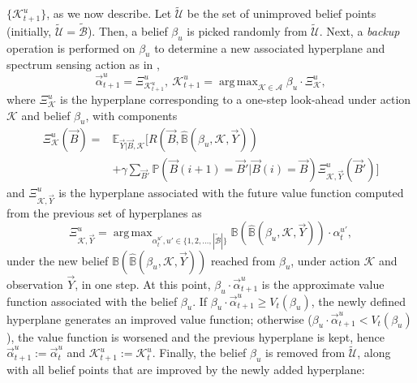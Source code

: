 \documentclass[10pt,twocolumn]{IEEEtran}
\DeclareMathOperator*{\argmax}{arg\,max}
\begin{document}
$\{\mathcal K_{t+1}^{u}\}$, as we now describe. Let $\tilde{\mathcal{U}}$ be the set of unimproved belief points (initially, $\tilde{\mathcal{U}}{=}\tilde{\mathcal{B}}$). Then, a belief $\beta_u$ is picked randomly from $\tilde{\mathcal{U}}$. Next, a \emph{backup} operation is performed on $\beta_u$ to determine a new associated hyperplane and spectrum sensing action as in \cite{DBLP:journals/corr/abs-1109-2145},
\begin{equation}\label{20}
    \vec{\alpha}_{t+1}^{u}=\Xi_{\mathcal K_{t+1}^{u}}^{u},\ 
    \mathcal K_{t+1}^{u}=\argmax_{\mathcal{K} \in \mathcal{A}} \beta_u \cdot \Xi_{\mathcal{K}}^{u},
\end{equation}
where $\Xi_{\mathcal{K}}^{u}$ is the hyperplane corresponding to a one-step look-ahead under action $\mathcal K$ and belief $\beta_u$, with components
\begin{align*}
\Xi_{\mathcal{K}}^{u}(\vec{B}) = &\mathbb{E}_{\vec{Y}|\vec{B}, \mathcal{K}} \Big[R(\vec{B}, \hat{\mathbb{B}}(\beta_{u}, \mathcal{K}, \vec{Y}))\\
&+\gamma 
        \sum_{\vec{B}'}\mathbb{P}(\vec{B}(i+1){=} \vec{B}'|\vec{B}(i){=}\vec{B})
                \Xi_{\mathcal{K}, \vec{Y}}^{u}(\vec{B}')\Big]
\nonumber
\end{align*}
and $\Xi_{\mathcal{K}, \vec{Y}}^{u}$ is the hyperplane associated with the future value function computed from the previous set of hyperplanes as
\begin{equation}
    \Xi_{\mathcal{K}, \vec{Y}}^{u}=\argmax_{\alpha_{t}^{u'}, u' {\in} \{1, 2, \dots, |\tilde{\mathcal{B}}|\}} \mathbb{B}(\hat{\mathbb{B}}(\beta_{u}, \mathcal{K}, \vec{Y}))\cdot\alpha_{t}^{u'},
\nonumber
\end{equation}
under the new belief $\mathbb{B}(\hat{\mathbb{B}}(\beta_{u}, \mathcal{K}, \vec{Y}))$ reached from $\beta_{u}$, under action $\mathcal{K}$ and observation $\vec{Y}$, in one step. At this point, $\beta_{u}{\cdot}\vec{\alpha}_{t+1}^{u}$ is the approximate value function associated with the belief $\beta_u$. If $\beta_{u}{\cdot}\vec{\alpha}_{t+1}^{u}{\geq}V_{t}(\beta_{u})$, the newly defined hyperplane generates an improved value function; otherwise ($\beta_{u}{\cdot}\vec{\alpha}_{t+1}^{u}{<}V_{t}(\beta_{u})$), the value function is worsened and the previous hyperplane is kept, hence $\vec{\alpha}_{t+1}^{u}{:=}\vec{\alpha}_{t}^{u}$ and $\mathcal K_{t+1}^{u}{:=}\mathcal K_{t}^{u}$. Finally, the belief $\beta_u$ is removed from $\tilde{\mathcal{U}}$, along with all belief points that are improved by the newly added hyperplane:
\end{document}
